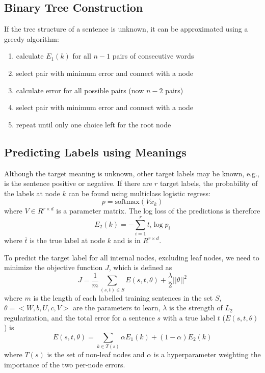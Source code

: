 \documentclass{article}
\begin{document}
%
%
\subsection{Binary Tree Construction}
\label{sec:greedy}
If the tree structure of a sentence is unknown, it can be approximated using a greedy algorithm:
\begin{enumerate}
    \item calculate $E_1(k)$ for all $n - 1$ pairs of consecutive words
    \item select pair with minimum error and connect with a node
    \item calculate error for all possible pairs (now $n-2$ pairs)
    \item select pair with minimum error and connect with a node
    \item repeat until only one choice left for the root node
\end{enumerate}


%
%
\subsection{Predicting Labels using Meanings}
Although the target meaning is unknown, other target labels may be known, e.g., is the sentence positive or negative. If there are $r$ target labels, the probability of the labels at node $k$ can be found using multiclass logistic regress:
\begin{equation}
    \bar{p} = \textrm{softmax}(V x_k)
\end{equation}
where $V \in R^{r \times d}$ is a parameter matrix. The log loss of the predictions is therefore
\begin{equation}
    E_2 (k) = - \sum_{i=1}^r t_i \log p_i
\end{equation}
where $\bar{t}$ is the true label at node $k$ and is in $R^{r \times d}$.

To predict the target label for all internal nodes, excluding leaf nodes, we need to minimize the objective function $J$, which is defined as
\begin{equation}
    J = \frac{1}{m} \sum_{(s,t) \in S} E(s, t, \theta) + \frac{\lambda}{2} ||\theta||^2
\end{equation}
where $m$ is the length of each labelled training sentences in the set $S$, $\theta = < W, b, U, c, V >$ are the parameters to learn, $\lambda$ is the strength of $L_2$ regularization, and the total error for a sentence $s$ with a true label $t$ ($E(s, t, \theta)$) is
\begin{equation}
    E(s,t, \theta) = \sum_{k \in T(s)} \alpha E_1(k) + (1-\alpha) E_2(k)
\end{equation}
where $T(s)$ is the set of non-leaf nodes and $\alpha$ is a hyperparameter weighting the importance of the two per-node errors.
\end{document}
